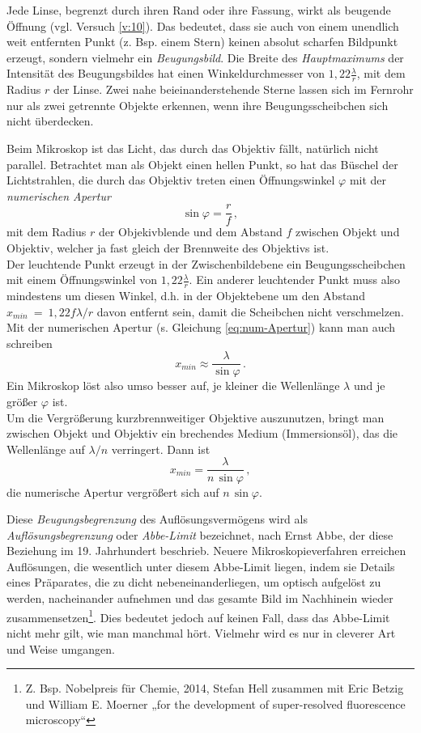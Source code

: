 Jede Linse, begrenzt durch ihren Rand oder ihre Fassung, wirkt als beugende Öffnung (vgl. Versuch \ref{v:10}). Das bedeutet, dass sie auch von einem unendlich weit entfernten Punkt (z. Bsp. einem Stern) keinen absolut scharfen Bildpunkt erzeugt, sondern vielmehr ein \textit{Beugungsbild}. Die Breite des \textit{Hauptmaximums} der Intensität des Beugungsbildes hat einen Winkeldurchmesser von $1,22\frac{\lambda}{r}$, mit dem Radius $r$ der Linse. Zwei nahe beieinanderstehende Sterne lassen sich im Fernrohr nur als zwei getrennte Objekte erkennen, wenn ihre Beugungsscheibchen sich nicht überdecken.

Beim Mikroskop ist das Licht, das durch das Objektiv fällt, natürlich nicht parallel. Betrachtet man als Objekt einen hellen Punkt, so hat das Büschel der Lichtstrahlen, die durch das Objektiv treten einen Öffnungswinkel $\varphi$ mit der \textit{numerischen Apertur}
\begin{equation} \label{eq:num-Apertur}
	\sin\varphi = \frac{r}{f}\, ,
\end{equation} 
mit dem Radius $r$ der Objekivblende und dem Abstand $f$ zwischen Objekt und Objektiv, welcher ja fast gleich der Brennweite des Objektivs ist.\\
Der leuchtende Punkt erzeugt in der Zwischenbildebene ein Beugungsscheibchen mit einem Öffnungswinkel von $1,22\frac{\lambda}{r}$. Ein anderer leuchtender Punkt muss also mindestens um diesen Winkel, d.h. in der Objektebene um den Abstand $x_{min}~=~1,22f\lambda/r$ davon entfernt sein, damit die Scheibchen nicht verschmelzen. Mit der numerischen Apertur (s. Gleichung \ref{eq:num-Apertur}) kann man auch schreiben
%
\begin{equation}
	x_{min} \approx \frac{\lambda}{\sin\varphi}\, .
\end{equation}
%
Ein Mikroskop löst also umso besser auf, je kleiner die Wellenlänge $\lambda$ und je größer $\varphi$ ist.\\
Um die Vergrößerung kurzbrennweitiger Objektive auszunutzen, bringt man zwischen Objekt und Objektiv ein brechendes Medium (Immersionsöl), das die Wellenlänge auf $\lambda/n$ verringert. Dann ist
%
\begin{equation}
	x_{min} = \frac{\lambda}{n\,\sin\varphi} \, ,
\end{equation}
%
die numerische Apertur vergrößert sich auf $n\,\sin\varphi$.

Diese \textit{Beugungsbegrenzung} des Auflösungsvermögens wird als \textit{Auflösungsbegrenzung} oder \textit{Abbe-Limit} bezeichnet, nach Ernst Abbe, der diese Beziehung im 19. Jahrhundert beschrieb. Neuere Mikroskopieverfahren erreichen Auflösungen, die wesentlich unter diesem Abbe-Limit liegen, indem sie Details eines Präparates, die zu dicht nebeneinanderliegen, um optisch aufgelöst zu werden, nacheinander aufnehmen und das gesamte Bild im Nachhinein wieder zusammensetzen\footnote{Z. Bsp. Nobelpreis für Chemie, 2014, Stefan Hell zusammen mit Eric Betzig und William E. Moerner „for the development of super-resolved fluorescence microscopy“}. Dies bedeutet jedoch auf keinen Fall, dass das Abbe-Limit nicht mehr gilt, wie man manchmal hört. Vielmehr wird es nur in cleverer Art und Weise umgangen.


